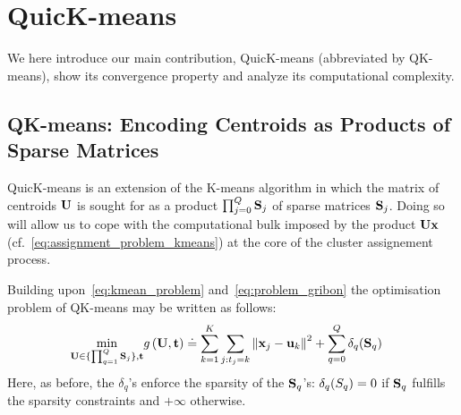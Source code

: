 
\section{QuicK-means}
\label{sec:contribution}

We here introduce our main contribution, QuicK-means (abbreviated by QK-means), 
show its convergence property and analyze its computational complexity.

\subsection{QK-means: Encoding Centroids as Products of Sparse Matrices}

QuicK-means is an extension of the K-means algorithm in which the matrix of centroids ${\mathbf{U}}$
is sought for as a product $\prod_{j=0}^Q{\mathbf{S}}_j$ of sparse matrices ${\mathbf{S}}_j$.
Doing so will allow us to cope with the computational bulk imposed by the product ${\mathbf{U}}{\mathbf{x}}$
(cf.~\eqref{eq:assignment_problem_kmeans}) at the core of the cluster assignement process.

Building upon~\eqref{eq:kmean_problem} and~\eqref{eq:problem_gribon} the optimisation problem 
of QK-means may be written as follows:
%
\begin{align}
\label{eq:qmean_problem}
 \min_{{\mathbf{U}}\in\{\prod_{q=1}^Q{\mathbf{S}}_j\}, {\mathbf{t}}} & g\left({\mathbf{U}}, {\mathbf{t}}\right)
    \doteq \sum_{k=1}^{K}\sum_{j: t_j = k} \left\|{\mathbf{x}}_j -{\mathbf{u}}_k\right\|^2 + \sum_{q=0}^{Q} \delta_q({\mathbf{S}}_q)
\end{align}
%
Here, 
as before, the $\delta_q$'s enforce the sparsity of the ${\mathbf{S}}_q$'s: $\delta_q({S}_q)=0$ if ${\mathbf{S}}_q$ fulfills the sparsity constraints
and $+\infty$ otherwise.


